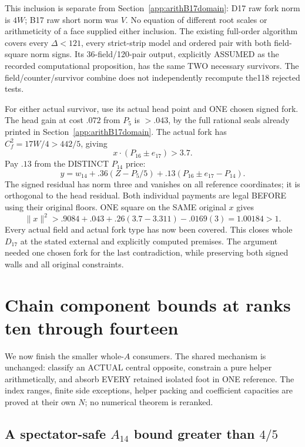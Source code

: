 \documentclass[11pt]{article}
\begin{document}
This inclusion is separate from
Section~\ref{app:arithB17domain}:
D17 raw fork norm is \(4W\);
B17 raw short norm was \(V\).
No equation of different root scales or
arithmeticity of a face supplied either inclusion.
The existing full-order algorithm covers every
\(\Delta<121\), every strict-strip model and
ordered pair with both field-square norm signs.
Its 36-field/120-pair output, explicitly ASSUMED
as the recorded computational proposition, has
the same TWO necessary survivors.
The field/counter/survivor combine does not
independently recompute the118 rejected tests.

For either actual survivor, use its actual
head point and ONE chosen signed fork.
The head gain at cost \(.072\) from \(P_5\)
is \(>.043\), by the full rational seals already
printed in Section~\ref{app:arithB17domain}.
The actual fork has
\(C_f^2=17W/4>442/5\), giving
\[
                 x\cdot(P_{16}\pm e_{17})>3.7 .
\]
Pay \(.13\) from the DISTINCT \(P_{14}\) price:
\[
             y=w_{14}+.36(Z-P_5/5)
                          +.13(P_{16}\pm e_{17}-P_{14}).
\]
The signed residual has norm three and
vanishes on all reference coordinates;
it is orthogonal to the head residual.
Both individual payments are legal BEFORE
using their original floors.
ONE square on the SAME original \(x\) gives
\[
              \|x\|^2>.9084+.043+.26(3.7-3.311)-.0169(3)
                                     =1.00184>1 .
\]
Every actual field and actual fork type has
now been covered.
This closes whole \(D_{17}\) at the stated
external and explicitly computed premises.
The argument needed one chosen fork for the
last contradiction, while preserving both
signed walls and all original constraints.

\section{Chain component bounds at ranks ten through fourteen}
\label{app:arithsmallerchains}

We now finish the smaller whole-\(A\) consumers.
The shared mechanism is unchanged: classify an
ACTUAL central opposite, constrain a pure helper
arithmetically, and absorb EVERY retained isolated
foot in ONE reference.
The index ranges, finite side exceptions, helper
packing and coefficient capacities are proved at
their own \(N\); no numerical theorem is reranked.

\subsection[A spectator-safe A14 bound greater than 4/5]{A spectator-safe \(A_{14}\) bound greater than \(4/5\)}
\label{app:arithA14fourfifths}
\end{document}
